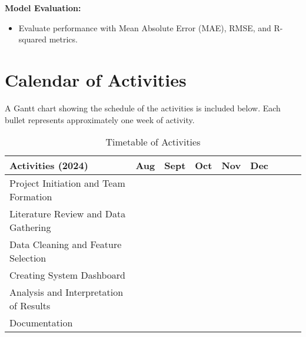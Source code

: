 \textbf{Model Evaluation:}
\begin{itemize}
	\item Evaluate performance with Mean Absolute Error (MAE), RMSE, and R-squared metrics.
\end{itemize}

\section{Calendar of Activities}

A Gantt chart showing the schedule of the activities is included below. Each bullet represents approximately one week of activity.

\newcommand{\weekone}{\textbullet}
\newcommand{\weektwo}{\textbullet \textbullet}
\newcommand{\weekthree}{\textbullet \textbullet \textbullet}
\newcommand{\weekfour}{\textbullet \textbullet \textbullet \textbullet}

\begin{table}[ht]
	\centering
	\caption{Timetable of Activities} \vspace{0.25em}
	\begin{tabular}{|p{2in}|c|c|c|c|c|c|c|c|} \hline
		Activities (2024) & Aug & Sept & Oct & Nov & Dec \\ \hline
		Project Initiation and Team Formation & \weektwo & & & & \\ \hline
		Literature Review and Data Gathering & \weektwo & \weekfour & & & \\ \hline
		Data Cleaning and Feature Selection & & \weektwo & & \weekone & \\ \hline
		
		
		Creating System Dashboard & & \weekone & \weektwo & \weekone & \\ \hline
		Analysis and Interpretation of Results & & & \weekone & & \\ \hline
		Documentation & & \weekone & \weekfour & \weekone & \\ \hline
	\end{tabular}
	\label{tab:timetableactivities}
\end{table}


